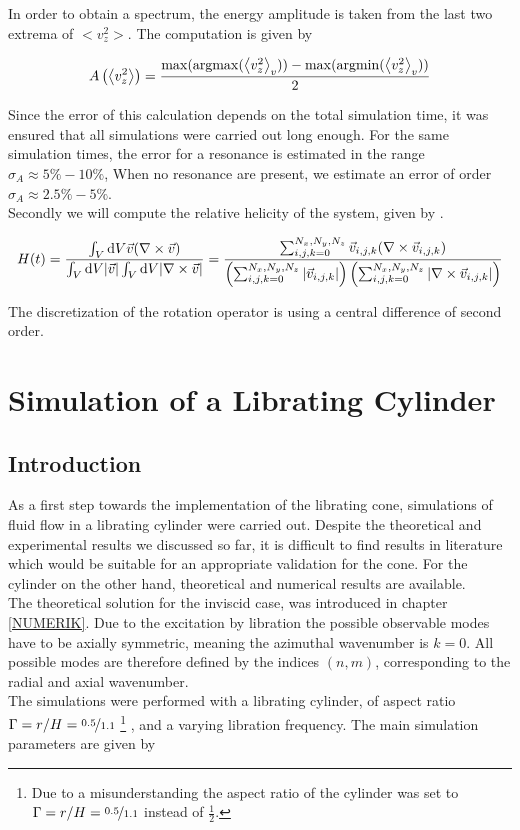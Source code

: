 In order to obtain a spectrum, the energy amplitude is taken from the last two extrema of $<v_z^2>$.
The computation is given by

\begin{align}
    A\left(\left<v_z^2\right>\right) = \frac{\max(\operatorname*{argmax}(\left<v_z^2\right>_{v})) - \max(\operatorname*{argmin}(\left<v_z^2\right>_{v}))}{2}
\end{align}

Since the error of this calculation depends on the total simulation time, it was ensured that all simulations
were carried out long enough.
For the same simulation times, the error for a resonance is estimated in the range $\sigma_A \approx 5\% - 10\%$,
When no resonance are present, we estimate an error of order $\sigma_A \approx 2.5\% - 5\%$.\\
Secondly we will compute the relative helicity of the system, given by \citep{PAPER}.

\begin{align}
H(t) = \frac{\int_V \mathop{}\!\mathrm{d} V \vec{v} (\nabla \times \vec{v})}
{\int_V \mathop{}\!\mathrm{d} V |\vec{v}| \int_V \mathop{}\!\mathrm{d} V |\nabla \times \vec{v}|}
 = \frac{\sum_{i,j,k=0}^{N_x, N_y, N_z} \vec{v}_{i,j,k} (\nabla \times \vec{v}_{i, j, k})}
 {\left(\sum_{i,j,k=0}^{N_x, N_y, N_z}|\vec{v}_{i,j,k}|\right)
 \left(\sum_{i,j,k=0}^{N_x, N_y, N_z}
 | \nabla \times \vec{v}_{i, j, k}|\right)}
\end{align}

The discretization of the rotation operator is using a central difference of second order.
\clearpage


\section{Simulation of a Librating Cylinder}
\subsection{Introduction}
\label{cone:sec:lib_cylinder}

As a first step towards the implementation of the librating cone, simulations of fluid flow in a librating cylinder were carried out.
Despite the theoretical and experimental results we discussed so far,
it is difficult to find results in literature which would be suitable for an appropriate validation for the cone.
For the cylinder on the other hand, theoretical and numerical results are available.\\
The theoretical solution for the inviscid case, was introduced in chapter \ref{NUMERIK}.
Due to the excitation by libration the possible observable modes have to be axially symmetric, meaning the azimuthal wavenumber is $k=0$.
All possible modes are therefore defined by the indices $(n, m)$, corresponding to the radial and axial wavenumber.\\
The simulations were performed with a librating cylinder, of aspect ratio $\Gamma=r/H=\nicefrac{0.5}{1.1}$
\footnote{Due to a misunderstanding the aspect ratio of the cylinder was set to $\Gamma=r/H=\nicefrac{0.5}{1.1}$ instead of $\frac{1}{2}$.}
, and a varying libration frequency.
The main simulation parameters are given by


